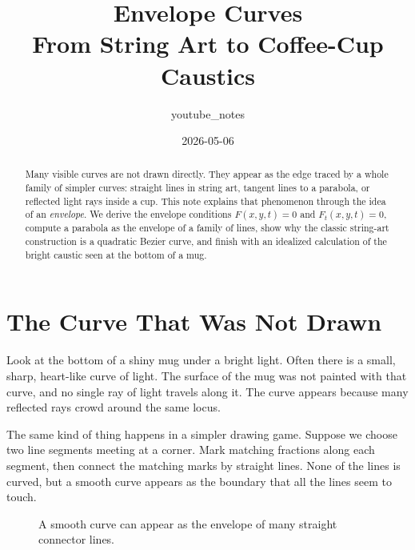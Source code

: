 \documentclass[11pt]{article}
\title{Envelope Curves\\\large From String Art to Coffee-Cup Caustics}
\author{youtube\_notes}
\date{2026-05-06}
\begin{document}
\maketitle

\begin{abstract}
Many visible curves are not drawn directly. They appear as the edge traced by a whole family of simpler curves: straight lines in string art, tangent lines to a parabola, or reflected light rays inside a cup. This note explains that phenomenon through the idea of an \emph{envelope}. We derive the envelope conditions \(F(x,y,t)=0\) and \(F_t(x,y,t)=0\), compute a parabola as the envelope of a family of lines, show why the classic string-art construction is a quadratic Bezier curve, and finish with an idealized calculation of the bright caustic seen at the bottom of a mug.
\end{abstract}

\tableofcontents
\newpage

\section{The Curve That Was Not Drawn}

Look at the bottom of a shiny mug under a bright light. Often there is a small, sharp, heart-like curve of light. The surface of the mug was not painted with that curve, and no single ray of light travels along it. The curve appears because many reflected rays crowd around the same locus.

The same kind of thing happens in a simpler drawing game. Suppose we choose two line segments meeting at a corner. Mark matching fractions along each segment, then connect the matching marks by straight lines. None of the lines is curved, but a smooth curve appears as the boundary that all the lines seem to touch.

\begin{figure}[htbp]
  \centering
  \caption{A smooth curve can appear as the envelope of many straight connector lines.}
  \label{fig:string-art-teaser}
\end{figure}
\end{document}
